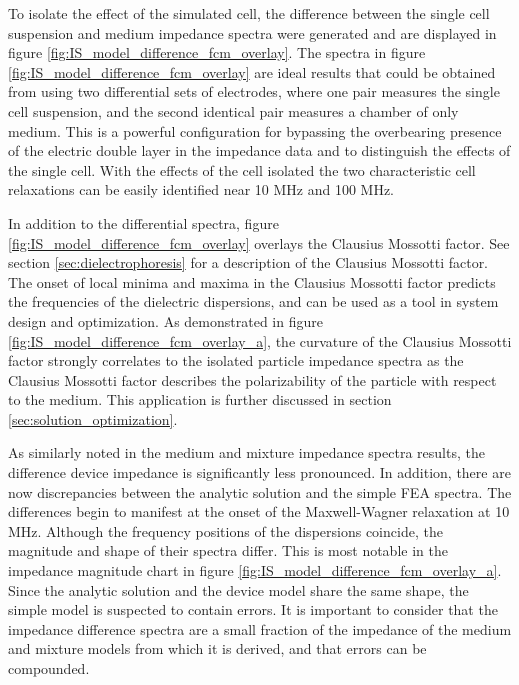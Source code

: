 \par To isolate the effect of the simulated cell, the difference between the single cell suspension and medium impedance spectra were generated and are displayed in figure \ref{fig:IS_model_difference_fcm_overlay}. The spectra in figure \ref{fig:IS_model_difference_fcm_overlay} are ideal results that could be obtained from using two differential sets of electrodes, where one pair measures the single cell suspension, and the second identical pair measures a chamber of only medium. This is a powerful configuration for bypassing the overbearing presence of the electric double layer in the impedance data and to distinguish the effects of the single cell. With the effects of the cell isolated the two characteristic cell relaxations can be easily identified near 10 MHz and 100 MHz.

\par In addition to the differential spectra, figure \ref{fig:IS_model_difference_fcm_overlay} overlays the Clausius Mossotti factor. See section \ref{sec:dielectrophoresis} for a description of the Clausius Mossotti factor.  The onset of local minima and maxima in the Clausius Mossotti factor predicts the frequencies of the dielectric dispersions, and can be used as a tool in system design and optimization. As demonstrated in figure \ref{fig:IS_model_difference_fcm_overlay_a}, the curvature of the Clausius Mossotti factor strongly correlates to the isolated particle impedance spectra as the Clausius Mossotti factor describes the polarizability of the particle with respect to the medium. This application is further discussed in section \ref{sec:solution_optimization}.

\par As similarly noted in the medium and mixture impedance spectra results, the difference device impedance is significantly less pronounced. In addition, there are now discrepancies between the analytic solution and the simple FEA spectra. The differences begin to manifest at the onset of the Maxwell-Wagner relaxation at 10 MHz. Although the frequency positions of the dispersions coincide, the magnitude and shape of their spectra differ. This is most notable in the impedance magnitude chart in figure \ref{fig:IS_model_difference_fcm_overlay_a}. Since the analytic solution and the device model share the same shape, the simple model is suspected to contain errors. It is important to consider that the impedance difference spectra are a small fraction of the impedance of the medium and mixture models from which it is derived, and that errors can be compounded.


